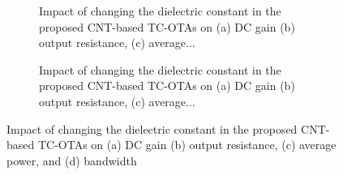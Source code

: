 
\begin{figure}[htbp]
  \centering
  \begin{subfigure}[b]{0.48\linewidth}
    \centering
    \caption{Impact of changing the dielectric constant in the proposed CNT-based TC-OTAs on (a) DC gain (b) output resistance, (c) average...}

  \end{subfigure}
  \hfill
  \begin{subfigure}[b]{0.48\linewidth}
    \centering
    \caption{Impact of changing the dielectric constant in the proposed CNT-based TC-OTAs on (a) DC gain (b) output resistance, (c) average...}

  \end{subfigure}
  \caption{Impact of changing the dielectric constant in the proposed CNT-based TC-OTAs on (a) DC gain (b) output resistance, (c) average power, and (d) bandwidth}

  \label{fig:group_r9a9f}
\end{figure}
